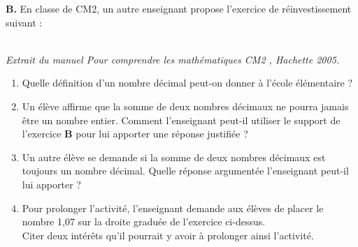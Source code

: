 \begin{exercice}[CRPE 2014 G1]
\textbf{B.} En classe de CM2, un autre enseignant propose l'exercice de réinvestissement suivant :
\begin{center}
    \\
   {\it Extrait du manuel \og Pour comprendre les mathématiques CM2 \fg, Hachette 2005.}
\end{center}
\begin{enumerate}
   \item Quelle définition d'un nombre décimal peut-on donner à l'école élémentaire ?
   \item Un élève affirme que la somme de deux nombres décimaux ne pourra jamais être un nombre entier. Comment l'enseignant peut-il utiliser le support de l'exercice {\bf B} pour lui apporter une réponse justifiée ?
   \item Un autre élève se demande si la somme de deux nombres décimaux est toujours un nombre décimal. Quelle réponse argumentée l'enseignant peut-il lui apporter ?
   \item Pour prolonger l'activité, l'enseignant demande aux élèves de placer le nombre 1,07 sur la droite graduée de l'exercice ci-dessus. \\
   Citer deux intérêts qu'il pourrait y avoir à prolonger ainsi l'activité.
\end{enumerate}
\end{exercice}

